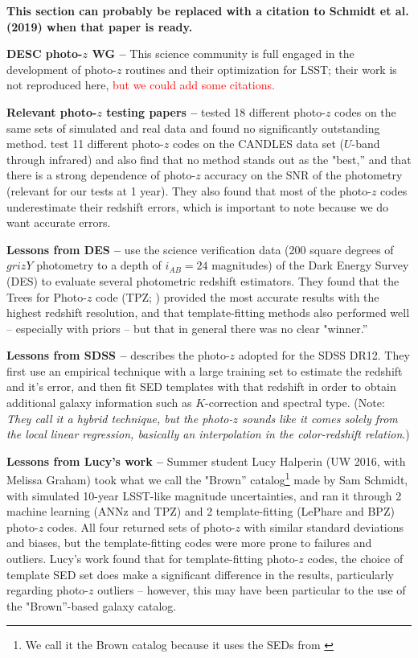 \documentclass[DM,lsstdraft,toc]{lsstdoc}
\begin{document}
{\bf This section can probably be replaced with a citation to Schmidt et al. (2019) when that paper is ready.}

\textbf{DESC photo-$z$ WG --} This science community is full engaged in the development of photo-$z$ routines and their optimization for LSST; their work is not reproduced here, \textcolor{red}{but we could add some citations.}

\textbf{Relevant photo-$z$ testing papers --} \cite{2010A&A...523A..31H} tested 18 different photo-$z$ codes on the same sets of simulated and real data and found no significantly outstanding method. \cite{2013ApJ...775...93D} test 11 different photo-$z$ codes on the CANDLES data set ($U$-band through infrared) and also find that no method stands out as the "best,'' and that there is a strong dependence of photo-$z$ accuracy on the SNR of the photometry (relevant for our tests at 1 year). They also found that most of the photo-$z$ codes underestimate their redshift errors, which is important to note because we do want accurate errors.

\textbf{Lessons from DES --} \cite{2014MNRAS.445.1482S} use the science verification data (200 square degrees of $grizY$ photometry to a depth of $i_{AB}=24$ magnitudes) of the Dark Energy Survey (DES) to evaluate several photometric redshift estimators. They found that the Trees for Photo-$z$ code (TPZ; \citealt{2013ascl.soft04011C}) provided the most accurate results with the highest redshift resolution, and that template-fitting methods also performed well -- especially with priors -- but that in general there was no clear "winner.''

\textbf{Lessons from SDSS --} \cite{2016MNRAS.460.1371B} describes the photo-$z$ adopted for the SDSS DR12. They first use an empirical technique with a large training set to estimate the redshift and it's error, and then fit SED templates with that redshift in order to obtain additional galaxy information such as $K$-correction and spectral type. (Note: \textit{They call it a hybrid technique, but the photo-$z$ sounds like it comes solely from the local linear regression, basically an interpolation in the color-redshift relation}.)

\textbf{Lessons from Lucy's work --} Summer student Lucy Halperin (UW 2016, with Melissa Graham) took what we call the "Brown'' catalog\footnote{We call it the Brown catalog because it uses the SEDs from \cite{2014ApJS..212...18B}} made by Sam Schmidt, with simulated 10-year LSST-like magnitude uncertainties, and ran it through 2 machine learning (ANNz and TPZ) and 2 template-fitting (LePhare and BPZ) photo-$z$ codes. All four returned sets of photo-$z$ with similar standard deviations and biases, but the template-fitting codes were more prone to failures and outliers. Lucy's work found that for template-fitting photo-$z$ codes, the choice of template SED set does make a significant difference in the results, particularly regarding photo-$z$ outliers -- however, this may have been particular to the use of the "Brown''-based galaxy catalog.
\end{document}
